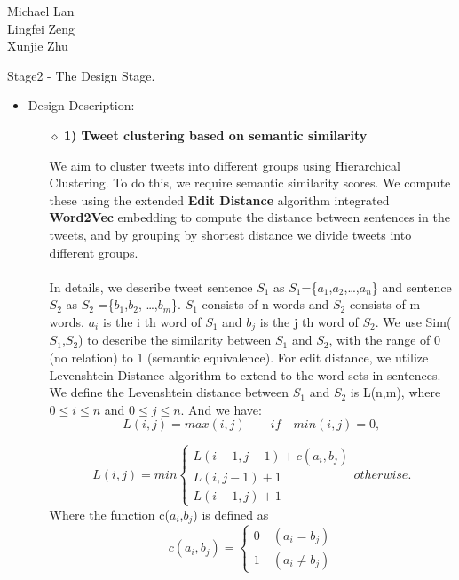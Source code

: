 \documentclass[10pt]{article}
\begin{document}
\begin{raggedright}
Michael Lan \\
Lingfei Zeng \\
Xunjie Zhu \\
\end{raggedright}

\vspace{5mm} 

Stage2 - The Design Stage. 
\begin{itemize} 
\item{ Design Description:\\} 
\begin{itemize}
The user is given 3 different similarity measures for searching. We will begin with the first similarity measure, which allows users to find tweets clusters related to search term inputs.
(Search phrase and retrieve tweets with similar phrases acc to edit distance)

\item[$\diamond$]{\bf1) Tweet clustering based on semantic similarity}

We aim to cluster tweets into different groups using Hierarchical Clustering. To do this, we require semantic similarity scores. We compute these using the extended {\bf Edit Distance} algorithm integrated {\bf Word2Vec} embedding to compute the distance between sentences in the tweets, and by grouping by shortest distance we divide tweets into different groups. \\\\
In details, we describe tweet sentence $S_1$ as $S_1$=\{$a_1$,$a_2$,…,$a_n$\} and sentence $S_2$ as $S_2$ =\{$b_1$,$b_2$, …,$b_m$\}. $S_1$ consists of n words and $S_2$ consists of m words. $a_i$ is the i th word of $S_1$ and $b_j$ is the j th word of $S_2$. We use Sim($S_1$,$S_2$) to describe the similarity between $S_1$ and $S_2$, with the range of 0 (no relation) to 1 (semantic equivalence). For edit distance, we utilize Levenshtein Distance algorithm to extend to the word sets in sentences. We define the Levenshtein distance between $S_1$ and $S_2$ is L(n,m), where  \(0\leq i\leq n\) and \(0\leq j\leq n\). And we have: \[L(i, j) = max(i, j)  \qquad   if \quad min(i,j)=0, \]  

$$
L(i, j) = min
\left\{
\begin{array}{ll}
L(i-1, j-1) + c(a_i,b_j) \\
L(i, j-1) +1 \\
L(i-1, j) +1
\end{array}
\right.
otherwise.
$$
Where the function c($a_i$,$b_j$) is defined as
$$
c(a_i, b_j)=
\left\{
\begin{array}{ll}
0 \quad (a_i = b_j) \\
1 \quad (a_i \neq b_j)
\end{array}
\right.
$$


\end{itemize}
\end{itemize}
\end{document}
